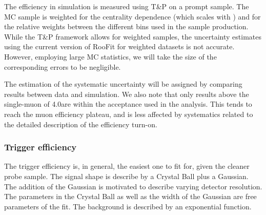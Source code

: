 The efficiency in simulation is measured using T\&P on a prompt \Jpsi sample.  
The MC sample is weighted for the centrality dependence (which scales with \ncoll) and for the relative weights between the different \pt bins used in the sample production. 
While the T\&P framework allows for weighted samples, the uncertainty estimates using the current version of RooFit for weighted datasets is not accurate. 
However, employing large MC statistics, we will take the size of the corresponding errors to be negligible. 

The estimation of the systematic uncertainty will be assigned by comparing results between data and simulation.  
%
We also note that only results above the single-muon \pt of 4.0\GeVc are within the acceptance used in the analysis. 
This tends to reach the muon efficiency plateau, and is less affected by systematics related to the detailed description of the efficiency turn-on. 



\subsubsection{Trigger efficiency}

The trigger efficiency is, in general, the easiest one to fit for, given the cleaner probe sample. The signal shape is describe by a Crystal Ball plus a Gaussian. The addition of the Gaussian is motivated to describe varying detector resolution. The parameters in the Crystal Ball as well as the width of the Gaussian are free parameters of the fit. The background is described by an exponential function. 

